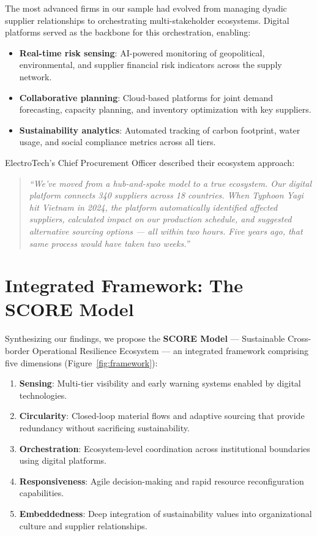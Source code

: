 \documentclass[12pt,a4paper,twoside]{article}
\begin{document}
The most advanced firms in our sample had evolved from managing dyadic
supplier relationships to orchestrating multi-stakeholder ecosystems.  Digital
platforms served as the backbone for this orchestration, enabling:

\begin{itemize}
  \item \textbf{Real-time risk sensing}: AI-powered monitoring of geopolitical,
        environmental, and supplier financial risk indicators across the supply
        network.
  \item \textbf{Collaborative planning}: Cloud-based platforms for joint demand
        forecasting, capacity planning, and inventory optimization with key
        suppliers.
  \item \textbf{Sustainability analytics}: Automated tracking of carbon
        footprint, water usage, and social compliance metrics across all tiers.
\end{itemize}

ElectroTech's Chief Procurement Officer described their ecosystem approach:

\begin{quote}
\itshape
``We've moved from a hub-and-spoke model to a true ecosystem.  Our digital
platform connects 340 suppliers across 18 countries.  When Typhoon Yagi hit
Vietnam in 2024, the platform automatically identified affected suppliers,
calculated impact on our production schedule, and suggested alternative sourcing
options --- all within two hours.  Five years ago, that same process would have
taken two weeks.''
\end{quote}

\section{Integrated Framework: The SCORE Model}
\label{sec:framework}

Synthesizing our findings, we propose the \textbf{SCORE Model} --- Sustainable
Cross-border Operational Resilience Ecosystem --- an integrated framework
comprising five dimensions (Figure~\ref{fig:framework}):

\begin{enumerate}
  \item \textbf{Sensing}: Multi-tier visibility and early warning systems
        enabled by digital technologies.
  \item \textbf{Circularity}: Closed-loop material flows and adaptive sourcing
        that provide redundancy without sacrificing sustainability.
  \item \textbf{Orchestration}: Ecosystem-level coordination across
        institutional boundaries using digital platforms.
  \item \textbf{Responsiveness}: Agile decision-making and rapid resource
        reconfiguration capabilities.
  \item \textbf{Embeddedness}: Deep integration of sustainability values into
        organizational culture and supplier relationships.
\end{enumerate}
\end{document}

